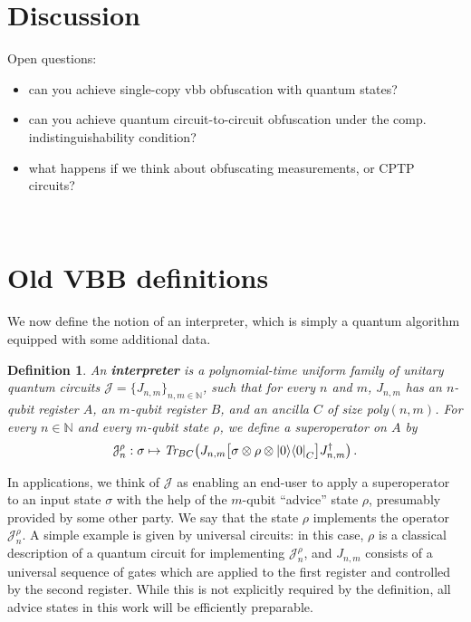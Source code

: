\documentclass[11pt]{article}
\numberwithin{equation}{section}
\newtheorem{definition}{Definition}
\newcommand{\N}{\mathbb{N}}
\begin{document}
\section{Discussion}

Open questions:
\begin{itemize}
\item can you achieve single-copy vbb obfuscation with quantum states?
\item can you achieve quantum circuit-to-circuit obfuscation under the comp. indistinguishability condition?
\item what happens if we think about obfuscating measurements, or CPTP circuits?
\end{itemize}

~\newpage~\newpage













\appendix

\section{Old VBB definitions}

We now define the notion of an interpreter, which is simply a quantum algorithm equipped with some additional data.

\begin{definition}
An \textbf{interpreter} is a polynomial-time uniform family of unitary quantum circuits $\mathcal J = \{J_{n, m}\}_{n, m \in \N}$, such that for every $n$ and $m$, $J_{n, m}$ has an $n$-qubit register $A$, an $m$-qubit register $B$, and an ancilla $C$ of size poly$(n, m)$. For every $n \in \N$ and every $m$-qubit state $\rho$, we define a superoperator on $A$ by
$$
\mathcal J_n^\rho : \sigma \mapsto \emph{Tr}_{BC}\bigl( J_{n, m}\bigl[ \sigma \otimes \rho \otimes {\left\vert{0}\right\rangle}{\left\langle{0}\right\vert}_C \bigr]J_{n, m}^\dagger\bigr)\,.
$$
\end{definition}

\noindent In applications, we think of $\mathcal J$ as enabling an end-user to apply a superoperator to an input state $\sigma$ with the help of the $m$-qubit ``advice'' state $\rho$, presumably provided by some other party. We say that the state $\rho$ implements the operator $\mathcal J_n^\rho$. A simple example is given by universal circuits: in this case, $\rho$ is a classical description of a quantum circuit for implementing $\mathcal J_n^\rho$, and $J_{n, m}$ consists of a universal sequence of gates which are applied to the first register and controlled by the second register. While this is not explicitly required by the definition, all advice states in this work will be efficiently preparable.
\end{document}
